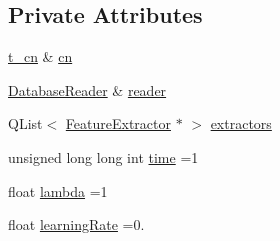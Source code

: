 \subsection*{Private Attributes}
\begin{DoxyCompactItemize}
\item 
\hyperlink{_complex_network_constructor_8hpp_a4f0848d3c2144cac74d7cdb1a6a23c30}{t\+\_\+cn} \& \hyperlink{class_complex_network_constructor_afcee75ad05cd5cf6e4510096987a105b}{cn}
\item 
\hyperlink{class_database_reader}{Database\+Reader} \& \hyperlink{class_complex_network_constructor_ad223ad7e464ff159d91a89deb4e943cc}{reader}
\item 
Q\+List$<$ \hyperlink{class_feature_extractor}{Feature\+Extractor} $\ast$ $>$ \hyperlink{class_complex_network_constructor_a75c5f820c19bae3cb46671aa89ef348f}{extractors}
\item 
unsigned long long int \hyperlink{class_complex_network_constructor_afc016404ca7dda4b05807e3ca004c308}{time} =1
\item 
float \hyperlink{class_complex_network_constructor_a9d3e346719dc1f8f3093a48b8d44e669}{lambda} =1
\item 
float \hyperlink{class_complex_network_constructor_aa7fe374b9733338b8176708f77d29c55}{learning\+Rate} =0.
\end{DoxyCompactItemize}


